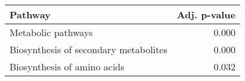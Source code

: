\begin{tabular}{lr}
\toprule
                               Pathway &  Adj. p-value \\
\midrule
                    Metabolic pathways &         0.000 \\
 Biosynthesis of secondary metabolites &         0.000 \\
           Biosynthesis of amino acids &         0.032 \\
\bottomrule
\end{tabular}
